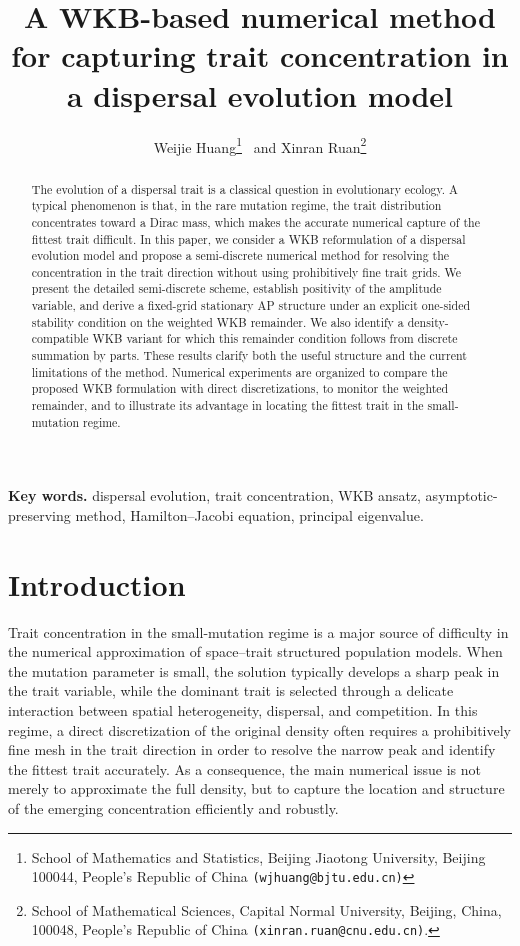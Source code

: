 \documentclass[11pt]{article}
\title{A WKB-based numerical method for capturing trait concentration in a dispersal evolution model}
\author{
Weijie Huang\thanks{School of Mathematics and Statistics, Beijing Jiaotong University, Beijing 100044, People's Republic of China {\tt (wjhuang@bjtu.edu.cn)}} \ and
Xinran Ruan\thanks{School of Mathematical Sciences, Capital Normal University, Beijing, China, 100048, People's Republic of China {\tt (xinran.ruan@cnu.edu.cn)}.}
}
\begin{document}
\date{}
\maketitle

\begin{abstract}
The evolution of a dispersal trait is a classical question in evolutionary ecology. A typical phenomenon is that, in the rare mutation regime, the trait distribution concentrates toward a Dirac mass, which makes the accurate numerical capture of the fittest trait difficult. In this paper, we consider a WKB reformulation of a dispersal evolution model and propose a semi-discrete numerical method for resolving the concentration in the trait direction without using prohibitively fine trait grids. We present the detailed semi-discrete scheme, establish positivity of the amplitude variable, and derive a fixed-grid stationary AP structure under an explicit one-sided stability condition on the weighted WKB remainder. We also identify a density-compatible WKB variant for which this remainder condition follows from discrete summation by parts. These results clarify both the useful structure and the current limitations of the method. Numerical experiments are organized to compare the proposed WKB formulation with direct discretizations, to monitor the weighted remainder, and to illustrate its advantage in locating the fittest trait in the small-mutation regime.
\end{abstract}

{\bf Key words. } dispersal evolution, trait concentration, WKB ansatz, asymptotic-preserving method, Hamilton--Jacobi equation, principal eigenvalue.


\section{Introduction}

Trait concentration in the small-mutation regime is a major source of difficulty in the numerical approximation of space--trait structured population models. When the mutation parameter is small, the solution typically develops a sharp peak in the trait variable, while the dominant trait is selected through a delicate interaction between spatial heterogeneity, dispersal, and competition. In this regime, a direct discretization of the original density often requires a prohibitively fine mesh in the trait direction in order to resolve the narrow peak and identify the fittest trait accurately. As a consequence, the main numerical issue is not merely to approximate the full density, but to capture the location and structure of the emerging concentration efficiently and robustly.
\end{document}
